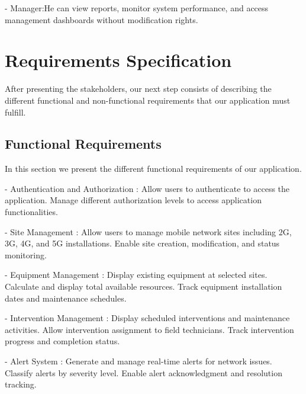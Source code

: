 - Manager:\newline He can view reports, monitor system performance, and access management dashboards without modification rights.\newline

\section{Requirements Specification}
After presenting the stakeholders, our next step consists of describing the different functional and non-functional requirements that our application must fulfill.

\subsection{Functional Requirements}
In this section we present the different functional requirements of our application.\vspace{0.5cm} \newline

- Authentication and Authorization :\newline
Allow users to authenticate to access the application.
Manage different authorization levels to access application functionalities.
\vspace{0.5cm} \newline

- Site Management : \newline
Allow users to manage mobile network sites including 2G, 3G, 4G, and 5G installations.
Enable site creation, modification, and status monitoring.
\vspace{0.5cm} \newline

- Equipment Management : \newline
Display existing equipment at selected sites.
Calculate and display total available resources.
Track equipment installation dates and maintenance schedules.
\vspace{0.5cm} \newline

- Intervention Management : \newline
Display scheduled interventions and maintenance activities.
Allow intervention assignment to field technicians.
Track intervention progress and completion status.
\vspace{0.5cm} \newline

- Alert System : \newline
Generate and manage real-time alerts for network issues.
Classify alerts by severity level.
Enable alert acknowledgment and resolution tracking.
\vspace{0.5cm} \newline


